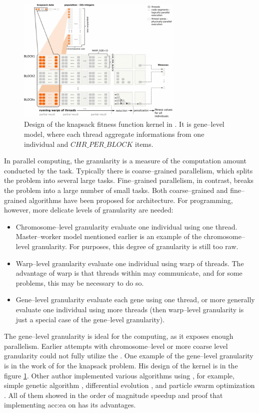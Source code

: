 \begin{figure}[hb!]
    \centering
    \includegraphics[width=0.7\textwidth]{img/KnapsackKernelDesign.png}
    \caption[Knapsack problem CUDA evaluation kernel]{Design of the knapsack fitness function kernel in \citet{GpuIsland}. It is gene--level model, where each thread aggregate informations from one individual and $CHR\_PER\_BLOCK$ items.}
    \label{fig:knapsackkernel}
\end{figure}

In parallel computing, the granularity is a measure of the computation amount conducted by the task. Typically there is coarse--grained parallelism, which splits the problem into several large tasks. Fine--grained parallelism, in contrast, breaks the problem into a large number of small tasks. Both coarse--grained and fine--grained algorithms have been proposed for \cpu architecture. For \gpu programming, however, more delicate levels of granularity are needed:
\begin{itemize}
    \item Chromosome--level granularity evaluate one individual using one thread. Master--worker model mentioned earlier is an example of the chromosome--level granularity. For \cuda purposes, this degree of granularity is still too raw.
    \item Warp--level granularity evaluate one individual using warp of threads. The advantage of warp is that threads within may communicate, and for some problems, this may be necessary to do so.
    \item Gene--level granularity evaluate each gene using one thread, or more generally evaluate one individual using more threads (then warp--level granularity is just a special case of the gene--level granularity).     
\end{itemize}
The gene--level granularity is ideal for the \gpu computing, as it exposes enough parallelism. Earlier attempts with chromosome--level or more coarse level granularity could not fully utilize the \gpuns. One example of the gene--level granularity is in the work of \citet*{GpuIsland} for the knapsack problem. His design of the \cuda kernel is in the figure \ref{fig:knapsackkernel}. Other author implemented various algorithms using \cudans, for example, simple genetic algorithm \citep{SimpleGACUDA}, differential evolution \citep{veronese2010differential}, and particle swarm optimization \citep{PSOCUDA}. All of them showed in the order of magnitude speedup and proof that implementing \acrlong{acc:ea} on \gpu has its advantages.
